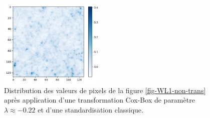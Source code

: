 \documentclass[12pt,twoside]{article}
\begin{document}
\begin{figure}
\centering
\includegraphics[width=0.45\textwidth]{fig-WL1-img-non-transformed.png}
\caption{Distribution des valeurs de pixels de la figure \ref{fig-WL1-non-trans} après application d'une transformation Cox-Box de paramètre $\lambda \approx -0.22$ et d'une standardisation classique.}
\label{fig-WL1-trans}
\end{figure}
\end{document}

